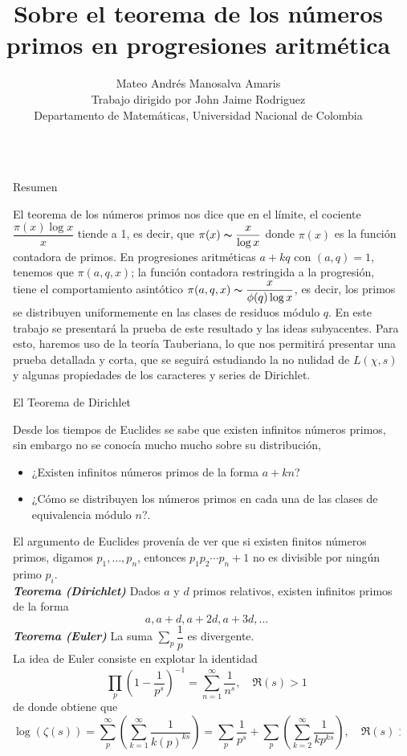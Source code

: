 \documentclass[final]{beamer}
\title{Sobre el teorema de los números primos en progresiones aritmética}
\author{Mateo Andrés Manosalva Amaris\\Trabajo dirigido por John Jaime Rodriguez\\Departamento de Matemáticas, Universidad Nacional de Colombia}
\newlength{\sepwidth}
\newlength{\colwidth}
\newcommand{\separatorcolumn}{\begin{column}{\sepwidth}\end{column}}
\newcommand{\defi}[1]{\textbf{\emph{#1}}}
\begin{document}
\begin{frame}[t,fragile]
\begin{columns}[t]
\separatorcolumn

\begin{column}{\colwidth}

  \begin{block}{Resumen}

El teorema de los números primos nos dice que en el límite, el cociente $\dfrac{\pi(x)\log x}{x}$ tiende a 1, es decir, que $\pi(x)\thicksim \dfrac{x}{\log x}$ donde $\pi(x)$ es la función contadora de primos. En progresiones aritméticas $a+kq$ con $(a,q)=1$, tenemos que $\pi(a,q,x)$; la función contadora restringida a la progresión, tiene el comportamiento asintótico $\pi(a,q,x)\thicksim \dfrac{x}{\phi(q)\log x}$, es decir, los primos se distribuyen uniformemente en las clases de residuos módulo $q$. En este trabajo se presentará la prueba de este resultado y las ideas subyacentes. Para esto, haremos uso de la teoría Tauberiana, lo que nos permitirá presentar una prueba detallada y corta, que se seguirá estudiando la no nulidad de $L(\chi,s)$ y algunas propiedades de los caracteres y series de Dirichlet.
  \end{block}

\begin{block}{El Teorema de Dirichlet}

Desde los tiempos de Euclides se sabe que existen infinitos números primos, sin embargo no se conocía mucho mucho sobre su distribución,
\begin{itemize}
    \item  ¿Existen infinitos números primos de la forma $a+kn$?
    \item ¿Cómo se distribuyen los números primos en cada  una de las clases de equivalencia módulo $n$?.
\end{itemize}
El argumento de Euclides provenía de ver que si existen finitos números primos, digamos $p_1,\ldots,p_n$, entonces $p_1p_2\cdots p_n+1$ no es divisible por ningún primo $p_i$.\\
\vspace*{0.3cm}
\defi{Teorema (Dirichlet)}
Dados $a$ y $d$ primos relativos, existen infinitos primos de la forma
    $$a, a+d,a+2d,a+3d,...$$
\defi{Teorema (Euler)} La suma $\displaystyle  \sum_{p}\dfrac{1}{p}$ es divergente.\\

La idea de Euler consiste en explotar la identidad 
$$\prod_p \left(1-\dfrac{1}{p^s}\right)^{-1}=\sum_{n=1}^{\infty}\dfrac{1}{n^s},\quad  \Re(s)>1$$
de donde obtiene que 
    $$
\log (\zeta(s))=\sum_p^{\infty}\left(\displaystyle\sum_{k=1}^{\infty} \dfrac{1}{k(p)^{k s}}\right)=\sum_p
\dfrac{1}{p^s}+\sum_{p}\left(\sum_{k=2}^{\infty}\dfrac{1}{kp^{ks}}\right), \quad \Re(s)>1$$
\end{block}
    

\end{column}
\end{columns}
\end{frame}
\end{document}
